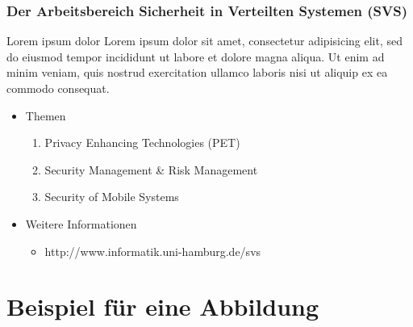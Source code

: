 \begin{frame}
	\frametitle{Der Arbeitsbereich Sicherheit in Verteilten Systemen (SVS)}
	\begin{block}{Lorem ipsum dolor}
		Lorem ipsum dolor sit amet, consectetur adipisicing elit, sed do eiusmod tempor incididunt ut labore et dolore magna aliqua. Ut enim ad minim veniam, quis nostrud exercitation ullamco laboris nisi ut aliquip ex ea commodo consequat. 
	\end{block}
	\begin{itemize}
		\item Themen
			\begin{enumerate}
				\item Privacy Enhancing Technologies (PET)
				\item Security Management \& Risk Management
				\item Security of Mobile Systems
			\end{enumerate}
		\item Weitere Informationen
			\begin{itemize}
				\item http://www.informatik.uni-hamburg.de/svs
			\end{itemize}
	\end{itemize}
\end{frame}

\section{Beispiel für eine Abbildung} %

